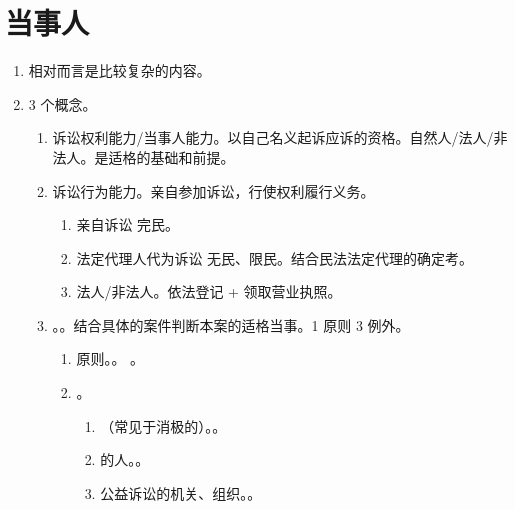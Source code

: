 \section{当事人}
\begin{enumerate}
  \item 相对而言是比较复杂的内容。
  \item 3 个概念。
        \begin{enumerate}
          \item 诉讼权利能力/当事人能力。以自己名义起诉应诉的资格。自然人/法人/非法人。是适格的基础和前提。
          \item 诉讼行为能力。亲自参加诉讼，行使权利履行义务。
                \begin{enumerate}
                  \item 亲自诉讼 \yjt 完民。
                  \item 法定代理人代为诉讼 \yjt 无民、限民。结合民法法定代理的确定考。
                  \item 法人/非法人。依法登记 + 领取营业执照。
                \end{enumerate}
          \item {}。。结合具体的案件判断本案的适格当事。1 原则 3 例外。
                \begin{enumerate}
                  \item 原则。。
                        。
                  \item {}。
                        \begin{enumerate}
                          \item （常见于消极的）。。
                          \item {}的人。。
                          \item 公益诉讼的机关、组织。。
                        \end{enumerate}
                \end{enumerate}


\end{enumerate}
\end{enumerate}

